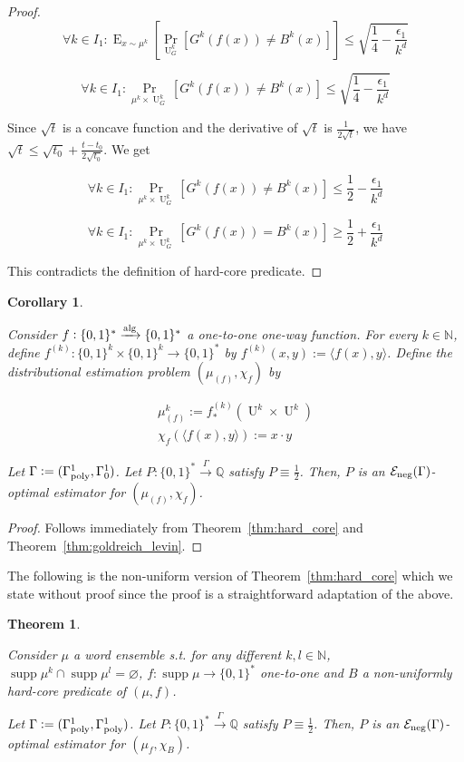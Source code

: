 \documentclass{article}
\numberwithin{equation}{section}
\theoremstyle{definition}
\theoremstyle{plain}
\newtheorem{theorem}{Theorem}[section]
\newtheorem{corollary}{Corollary}[section]
\newcommand{\Bool}{\{0,1\}}
\newcommand{\Words}{{\Bool^*}}
\newcommand{\WordsLen}[1]{{\Bool^{#1}}}
\DeclareMathOperator{\Supp}{supp}
\DeclareMathOperator{\Prb}{Pr}
\DeclareMathOperator{\E}{E}
\DeclareMathOperator{\Un}{U}
\newcommand{\Nats}{\mathbb{N}}
\newcommand{\Rats}{\mathbb{Q}}
\newcommand{\Chev}[1]{\langle #1 \rangle}
\newcommand{\Fall}{\mathcal{E}}
\newcommand{\GammaPoly}{\Gamma_{\textnormal{poly}}}
\newcommand{\Alg}{\xrightarrow{\textnormal{alg}}}
\newcommand{\Scheme}{\xrightarrow{\Gamma}}
\begin{document}
\begin{proof}
$$ \forall k \in I_1: \E_{x \sim \mu^k}[\Prb_{\Un_G^k}[G^k(f(x)) \ne B^k(x)]] \leq \sqrt{\frac{1}{4} - \frac{\epsilon_1}{k^d}} $$

$$ \forall k \in I_1: \Prb_{\mu^{k} \times \Un_G^k}[G^k(f(x)) \ne B^k(x)] \leq \sqrt{\frac{1}{4} - \frac{\epsilon_1}{k^d}} $$

Since $\sqrt{t}$ is a concave function and the derivative of $\sqrt{t}$ is $\frac{1}{2\sqrt{t}}$, we have $\sqrt{t} \leq \sqrt{t_0} + \frac{t-t_0}{2\sqrt{t_0}}$. We get

$$ \forall k \in I_1: \Prb_{\mu^{k} \times \Un_G^k}[G^k(f(x)) \ne B^k(x)] \leq \frac{1}{2}-\frac{\epsilon_1}{k^d}$$

$$ \forall k \in I_1: \Prb_{\mu^{k} \times \Un_G^k}[G^k(f(x)) = B^k(x)] \geq \frac{1}{2}+\frac{\epsilon_1}{k^d}$$

This contradicts the definition of hard-core predicate.
\end{proof}

\begin{corollary}
\label{crl:one_way}

Consider $f: \Words \Alg \Words$ a one-to-one one-way function. For every ${k \in \Nats}$, define $f^{(k)}: \WordsLen{k} \times \WordsLen{k} \rightarrow \Words$ by ${f^{(k)}(x,y):=\Chev{f(x),y}}$. Define the distributional estimation problem $(\mu_{(f)}, \chi_f)$ by 

\begin{align*}
\mu_{(f)}^k:=f_*^{(k)}(\Un^k \times \Un^k) \\
\chi_f(\Chev{f(x),y}):=x \cdot y
\end{align*}

Let $\Gamma:=(\GammaPoly^1,\Gamma_0^1)$. Let $P: \Words \Scheme \Rats$ satisfy $P \equiv \frac{1}{2}$. Then, $P$ is an $\Fall_{\textnormal{neg}}(\Gamma)$-optimal estimator for $(\mu_{(f)}, \chi_f)$.

\end{corollary}

\begin{proof}

Follows immediately from Theorem~\ref{thm:hard_core} and Theorem~\ref{thm:goldreich_levin}.
\end{proof}

The following is the non-uniform version of Theorem~\ref{thm:hard_core} which we state without proof since the proof is a straightforward adaptation of the above.

\begin{theorem}
\label{thm:hard_core_circ}

Consider $\mu$ a word ensemble s.t. for any different $k,l \in \Nats$, $\Supp \mu^k \cap \Supp \mu^l = \varnothing$, $f: \Supp \mu \rightarrow \Words$ one-to-one and $B$ a non-uniformly hard-core predicate of $(\mu,f)$. 

Let $\Gamma:=(\GammaPoly^1,\GammaPoly^1)$. Let $P: \Words \Scheme \Rats$ satisfy $P \equiv \frac{1}{2}$. Then, $P$ is an $\Fall_{\textnormal{neg}}(\Gamma)$-optimal estimator for $(\mu_f, \chi_B)$.

\end{theorem}
\end{document}
